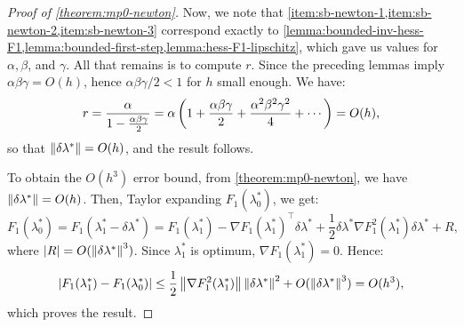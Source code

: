 \documentclass[eikonal.tex]{subfiles}
\begin{document}
\begin{proof}[Proof of \cref{theorem:mp0-newton}]
  Now, we note that
  \cref{item:sb-newton-1,item:sb-newton-2,item:sb-newton-3} correspond
  exactly to
  \cref{lemma:bounded-inv-hess-F1,lemma:bounded-first-step,lemma:hess-F1-lipschitz},
  which gave us values for $\alpha, \beta$, and $\gamma$. All that
  remains is to compute $r$. Since the preceding lemmas imply
  $\alpha\beta\gamma = O(h)$, hence $\alpha\beta\gamma/2 < 1$ for $h$
  small enough. We have:
  \begin{equation}
    r = \frac{\alpha}{1 - \frac{\alpha\beta\gamma}{2}} = \alpha \left(1 + \frac{\alpha\beta\gamma}{2} + \frac{\alpha^2\beta^2\gamma^2}{4} + \cdots\right) = O(h),
  \end{equation}
  so that $\left\|\delta\lambda^*\right\| = O(h)$, and the result follows.

  To obtain the $O(h^3)$ error bound, from \cref{theorem:mp0-newton},
  we have $\left\|\delta\lambda^*\right\| = O(h)$. Then, Taylor expanding
  $F_1(\lambda_0^*)$, we get:
  \begin{equation*}
    F_1(\lambda_0^*)
    = F_1(\lambda_1^* - \delta \lambda^*) = F_1(\lambda_1^*) - \nabla F_1(\lambda_1^*)^\top \delta\lambda^* + \frac{1}{2} \delta\lambda^* \nabla F_1^2(\lambda_1^*) \delta\lambda^* + R,
  \end{equation*}
  where $\left|R\right| = O(\left\|\delta\lambda^*\right\|^3)$. Since $\lambda_1^*$
  is optimum, $\nabla F_1(\lambda_1^*) = 0$. Hence:
  \begin{equation*}
    \left|F_1(\lambda_1^*) - F_1(\lambda_0^*)\right| \leq \frac{1}{2} \left\|\nabla F_1^2(\lambda_1^*)\right\| \left\|\delta\lambda^*\right\|^2 + O(\left\|\delta\lambda^*\right\|^3) = O(h^3),
  \end{equation*}
  which proves the result.
\end{proof}
\end{document}
